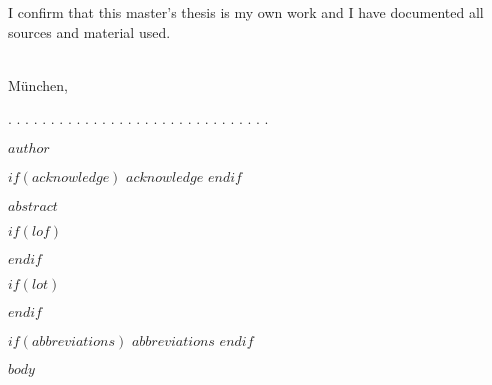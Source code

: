 \documentclass[a4paper]{article}
\newcommand{\thesisauthor}{$author$}
\begin{document}
\vfill

\newpage	
\thispagestyle{empty}
\vspace*{\fill}
\noindent I confirm that this master's thesis is my own work and I have documented all sources and material used.\\\\
\vspace{1cm}

München,

\vspace{3cm}

. . . . . . . . . . . . . . . . . . . . . . . . . . . . . . .
\vspace{0.1cm}

\thesisauthor{}

$if(acknowledge)$
\newpage
$acknowledge$
$endif$
\pagestyle{plain}
\clearpairofpagestyles
\ofoot*{\fontsize{8pt}{0pt}\pagemark} %
\setcounter{page}{1}    %

\newpage
$abstract$

\newpage
\tableofcontents
\clearpage

$if(lof)$
\newpage
\listoffigures
{}
$endif$

$if(lot)$
\newpage
\listoftables
{}
$endif$

$if(abbreviations)$
\newpage
$abbreviations$
$endif$

\newpage
\pagestyle{scrplain}  
\clearpairofpagestyles
\ofoot*{\fontsize{8pt}{0pt}\pagemark} %
\setcounter{page}{1}    %

$body$

\end{document}
